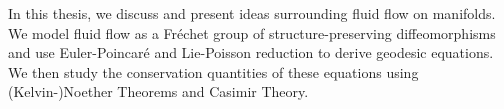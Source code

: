 
\noindent
In this thesis, we discuss and present ideas surrounding fluid flow on manifolds. We model fluid flow as a Fr\'echet group of structure-preserving diffeomorphisms and use Euler-Poincar\'e and Lie-Poisson reduction to derive geodesic equations. We then study the conservation quantities of these equations using (Kelvin-)Noether Theorems and Casimir Theory.